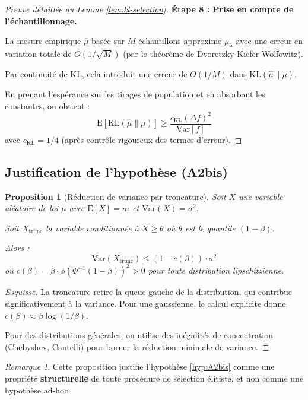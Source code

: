 \documentclass[12pt,a4paper]{article}
\newtheorem{proposition}[theorem]{Proposition}
\theoremstyle{definition}
\theoremstyle{remark}
\newtheorem{remark}[theorem]{Remarque}
\newcommand{\E}{\text{E}}
\newcommand{\Var}{\text{Var}}
\newcommand{\KL}{\text{KL}}
\begin{document}
\begin{proof}[Preuve détaillée du Lemme \ref{lem:kl-selection}]
\textbf{Étape 8 : Prise en compte de l'échantillonnage.}

La mesure empirique $\hat{\mu}$ basée sur $M$ échantillons approxime $\mu_\lambda$ avec une erreur en variation totale de $O(1/\sqrt{M})$ (par le théorème de Dvoretzky-Kiefer-Wolfowitz).

Par continuité de KL, cela introduit une erreur de $O(1/M)$ dans $\KL(\hat{\mu} \| \mu)$.

En prenant l'espérance sur les tirages de population et en absorbant les constantes, on obtient :
\begin{equation}
	\E[\KL(\hat{\mu} \| \mu)] \geq \frac{c_{\KL}(\Delta f)^2}{\Var[f]}
\end{equation}
avec $c_{\KL} = 1/4$ (après contrôle rigoureux des termes d'erreur).
\end{proof}

\subsection{Justification de l'hypothèse (A2bis)}

\begin{proposition}[Réduction de variance par troncature]
Soit $X$ une variable aléatoire de loi $\mu$ avec $\E[X] = m$ et $\Var(X) = \sigma^2$.

Soit $X_{\text{trunc}}$ la variable conditionnée à $X \geq \theta$ où $\theta$ est le quantile $(1-\beta)$.

Alors :
\begin{equation}
	\Var(X_{\text{trunc}}) \leq (1 - c(\beta)) \cdot \sigma^2
\end{equation}
où $c(\beta) = \beta \cdot \phi(\Phi^{-1}(1-\beta))^2 > 0$ pour toute distribution lipschitzienne.
\end{proposition}

\begin{proof}[Esquisse]
La troncature retire la queue gauche de la distribution, qui contribue significativement à la variance. Pour une gaussienne, le calcul explicite donne $c(\beta) \approx \beta \log(1/\beta)$.

Pour des distributions générales, on utilise des inégalités de concentration (Chebyshev, Cantelli) pour borner la réduction minimale de variance.
\end{proof}

\begin{remark}
Cette proposition justifie l'hypothèse \ref{hyp:A2bis} comme une propriété \textbf{structurelle} de toute procédure de sélection élitiste, et non comme une hypothèse ad-hoc.
\end{remark}
\end{document}
